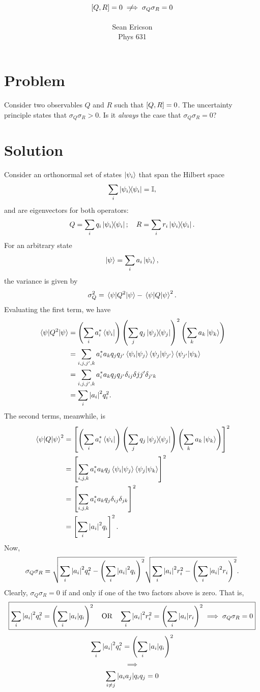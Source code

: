 \documentclass[12pt]{article}
\newcommand{\notimplies}{\mathrel{{\ooalign{\hidewidth$\not\phantom{=}$\hidewidth\cr$\implies$}}}}
\begin{document}
	
\title{$\comm{Q}{R} = 0 \notimplies \sigma_Q\sigma_R = 0$}
\author{Sean Ericson \\ Phys 631}
\maketitle

\section*{Problem}
Consider two observables $Q$ and $R$ such that $\comm{Q}{R} = 0$. The uncertainty principle states that $\sigma_Q\sigma_R > 0$. Is it \textit{always} the case that $\sigma_Q\sigma_R = 0$?

\section*{Solution}
Consider an orthonormal set of states $\ket{\psi_i}$ that span the Hilbert space
\[ \sum_i \dyad{\psi_i} = \mathbb{I}, \]
and are eigenvectors for both operators:
\[ Q = \sum_i q_i \dyad{\psi_i}; \quad R = \sum_i r_i \dyad{\psi_i}. \]
For an arbitrary state
\[ \ket{\psi} = \sum_i a_i\ket{\psi_i}, \]
the variance is given by
\[ \sigma_Q^2 = \ev{Q^2}{\psi} - \ev{Q}{\psi}^2. \]
Evaluating the first term, we have
\begin{align*}
    \ev{Q^2}{\psi} &= \left(\sum_i a_i^*\bra{\psi_i}\right)\left(\sum_j q_j\dyad{\psi_j}\right)^2\left(\sum_k a_k \ket{\psi_k}\right) \\
    &= \sum_{i,j,j',k}a_i^* a_k q_j q_{j'}\braket{\psi_i}{\psi_j}\braket{\psi_j}{\psi_{j'}}\braket{\psi_{j'}}{\psi_k} \\
    &= \sum_{i,j,j',k}a_i^* a_k q_j q_{j'}\delta_{ij}\delta{jj'}\delta_{j'k} \\
    &= \sum_{i}\abs{a_i}^2 q_i^2.
\end{align*}
The second terms, meanwhile, is
\begin{align*}
    \ev{Q}{\psi}^2 &= \left[\left(\sum_i a_i^*\bra{\psi_i}\right)\left(\sum_j q_j\dyad{\psi_j}\right)\left(\sum_k a_k \ket{\psi_k}\right)\right]^2 \\
    &= \left[\sum_{i,j,k}a_i^* a_k q_j\braket{\psi_i}{\psi_j}\braket{\psi_{j}}{\psi_k}\right]^2 \\
    &= \left[\sum_{i,j,k} a_i^* a_k q_j \delta_{ij}\delta_{jk}\right]^2 \\
    &= \left[\sum_i \abs{a_i}^2 q_i \right]^2.
\end{align*}
Now,
\[ \sigma_Q\sigma_R = \sqrt{\sum_i\abs{a_i}^2q_i^2 - \left(\sum_i\abs{a_i}^2q_i\right)^2}\sqrt{\sum_i\abs{a_i}^2r_i^2 - \left(\sum_i\abs{a_i}^2r_i\right)^2}. \]
Clearly, $\sigma_Q\sigma_R = 0$ if and only if one of the two factors above is zero. That is,
\[ \boxed{\sum_i \abs{a_i}^2q_i^2 = \left(\sum_i\abs{a_i}q_i\right)^2 \quad \text{OR} \quad \sum_i \abs{a_i}^2r_i^2 = \left(\sum_i\abs{a_i}r_i\right)^2 \implies \sigma_Q\sigma_R = 0} \]
\[ \sum_i \abs{a_i}^2q_i^2 = \left(\sum_i\abs{a_i}q_i\right)^2 \]
\[ \implies \]
\[ \sum_{i\neq j}\abs{a_i a_j}q_iq_j = 0 \]
\end{document}
